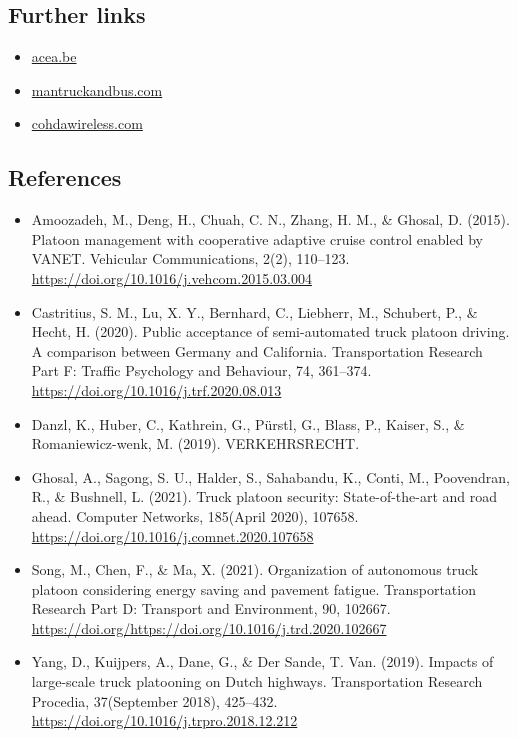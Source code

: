 \documentclass[
]{book}
\providecommand{\tightlist}{%
  \setlength{\itemsep}{0pt}\setlength{\parskip}{0pt}}
\begin{document}
\hypertarget{further-links-8}{%
\subsection*{Further links}\label{further-links-8}}

\begin{itemize}
\tightlist
\item
  \href{https://www.acea.be/uploads/publications/Platooning_roadmap.pdf}{acea.be}
\item
  \href{https://www.mantruckandbus.com/en/innovation/why-platooning-is-the-future-of-delivery-traffic.html}{mantruckandbus.com}
\item
  \href{https://cohdawireless.com/platooning/}{cohdawireless.com}
\end{itemize}

\hypertarget{references-9}{%
\subsection*{References}\label{references-9}}

\begin{itemize}
\tightlist
\item
  Amoozadeh, M., Deng, H., Chuah, C. N., Zhang, H. M., \& Ghosal, D. (2015). Platoon management with cooperative adaptive cruise control enabled by VANET. Vehicular Communications, 2(2), 110--123. \url{https://doi.org/10.1016/j.vehcom.2015.03.004}
\item
  Castritius, S. M., Lu, X. Y., Bernhard, C., Liebherr, M., Schubert, P., \& Hecht, H. (2020). Public acceptance of semi-automated truck platoon driving. A comparison between Germany and California. Transportation Research Part F: Traffic Psychology and Behaviour, 74, 361--374. \url{https://doi.org/10.1016/j.trf.2020.08.013}
\item
  Danzl, K., Huber, C., Kathrein, G., Pürstl, G., Blass, P., Kaiser, S., \& Romaniewicz-wenk, M. (2019). VERKEHRSRECHT.
\item
  Ghosal, A., Sagong, S. U., Halder, S., Sahabandu, K., Conti, M., Poovendran, R., \& Bushnell, L. (2021). Truck platoon security: State-of-the-art and road ahead. Computer Networks, 185(April 2020), 107658. \url{https://doi.org/10.1016/j.comnet.2020.107658}
\item
  Song, M., Chen, F., \& Ma, X. (2021). Organization of autonomous truck platoon considering energy saving and pavement fatigue. Transportation Research Part D: Transport and Environment, 90, 102667. \url{https://doi.org/https://doi.org/10.1016/j.trd.2020.102667}
\item
  Yang, D., Kuijpers, A., Dane, G., \& Der Sande, T. Van. (2019). Impacts of large-scale truck platooning on Dutch highways. Transportation Research Procedia, 37(September 2018), 425--432. \url{https://doi.org/10.1016/j.trpro.2018.12.212}
\end{itemize}
\end{document}
